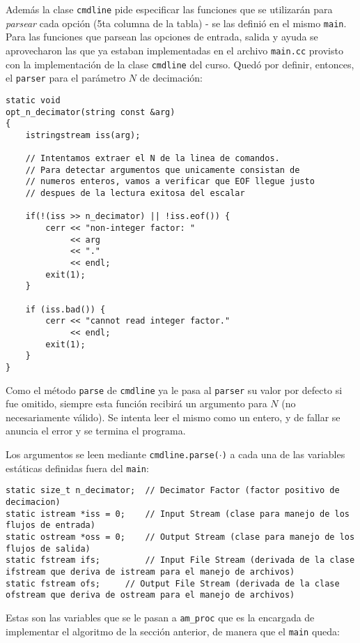 Además la clase \texttt{cmdline} pide especificar las funciones que se utilizarán para \emph{parsear} cada opción (5ta columna de la tabla) - se las definió en el mismo \texttt{main}. Para las funciones que parsean las opciones de entrada, salida y ayuda se aprovecharon las que ya estaban implementadas en el archivo \texttt{main.cc} provisto con la implementación de la clase \texttt{cmdline} del curso. Quedó por definir, entonces, el \texttt{parser} para el parámetro $N$ de decimación:


\lstset{language=C++} 
\begin{lstlisting}[frame=single]
static void
opt_n_decimator(string const &arg)
{
	istringstream iss(arg);

	// Intentamos extraer el N de la linea de comandos.
	// Para detectar argumentos que unicamente consistan de
	// numeros enteros, vamos a verificar que EOF llegue justo
	// despues de la lectura exitosa del escalar
	
	if(!(iss >> n_decimator) || !iss.eof()) {
		cerr << "non-integer factor: "
		     << arg
		     << "."
		     << endl;
		exit(1);
	}

	if (iss.bad()) {
		cerr << "cannot read integer factor."
		     << endl;
		exit(1);
	}
}
\end{lstlisting}

Como el método \texttt{parse} de \texttt{cmdline} ya le pasa al \texttt{parser} su valor por defecto si fue omitido, siempre esta función recibirá un argumento para $N$ (no necesariamente válido). Se intenta leer el mismo como un entero, y de fallar se anuncia el error y se termina el programa. 

Los argumentos se leen mediante \texttt{cmdline.parse($\cdot$)} a cada una de las variables estáticas definidas fuera del \texttt{main}:

 
\lstset{language=C++}
\begin{lstlisting}[frame=single]
static size_t n_decimator;	// Decimator Factor (factor positivo de decimacion)
static istream *iss = 0;	// Input Stream (clase para manejo de los flujos de entrada)
static ostream *oss = 0;	// Output Stream (clase para manejo de los flujos de salida)
static fstream ifs; 		// Input File Stream (derivada de la clase ifstream que deriva de istream para el manejo de archivos)
static fstream ofs;		// Output File Stream (derivada de la clase ofstream que deriva de ostream para el manejo de archivos)
\end{lstlisting}

Estas son las variables que se le pasan a \texttt{am\_proc} que es la encargada de implementar el algoritmo de la sección anterior, de manera que el \texttt{main} queda:



